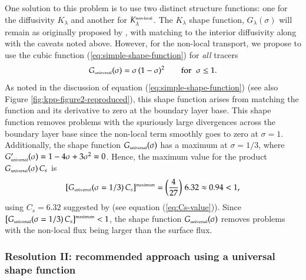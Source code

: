 One solution to this problem is to use two distinct structure
functions: one for the diffusivity $K_{\lambda}$ and another for
$K^{\mbox{\tiny non-local}}_{\lambda}$.  The $K_{\lambda}$ shape
function, $G_{\lambda}(\sigma)$ will remain as originally proposed by
\cite{LargeKPP}, with matching to the interior diffusivity along with
the caveats noted above.  However, for the non-local transport, we
propose to use the cubic function (\ref{eq:simple-shape-function}) for
{\it all} tracers
\begin{equation}
G_{\mbox{\tiny universal}}(\sigma)= \sigma \, (1-\sigma)^{2}   \qquad \mbox{for} \; \; \sigma \le 1. 
\label{eq:universal-non-local-structure}
\end{equation}
As noted in the discussion of equation
(\ref{eq:simple-shape-function}) (see also Figure
\ref{fig:kpp-figure2-reproduced}), this shape function arises from
matching the function and its derivative to zero at the boundary layer
base.  This shape function removes problems with the spuriously large
divergences across the boundary layer base since the non-local term
smoothly goes to zero at $\sigma =1$.  Additionally, the shape
function $G_{\mbox{\tiny universal}}(\sigma)$ has a maximum at $\sigma
= 1/3$, where $G_{\mbox{\tiny universal}}'(\sigma) = 1 -4\sigma +
3\sigma^2 = 0$.  Hence, the maximum value for the product
$G_{\mbox{\tiny universal}}(\sigma) \, C_{s}$ is
\begin{equation}
 \left[ G_{\mbox{\tiny universal}}(\sigma=1/3) \, C_{s} \right]^{\mbox{\tiny maximum}} =  \left( \frac{4}{27}  \right) \, 6.32 \approx 0.94 < 1, 
\end{equation}
using $C_{s} = 6.32$ suggested by \cite{LargeKPP} (see equation
(\ref{eq:Cs-value})).  Since $\left[ G_{\mbox{\tiny
      universal}}(\sigma=1/3) \, C_{s} \right]^{\mbox{\tiny maximum}}
< 1$, the shape function $G_{\mbox{\tiny universal}}(\sigma)$ removes
problems with the non-local flux being larger than the surface flux.


\subsubsection{Resolution II: recommended approach using a universal shape function}

